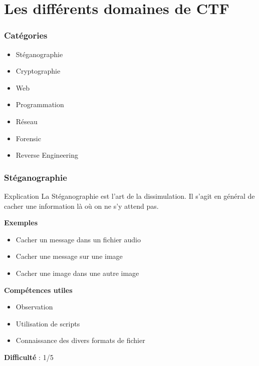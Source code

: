 \documentclass{beamer}
\begin{document}
\section{Les différents domaines de CTF}

\begin{frame}\frametitle{Catégories}

\begin{itemize}
    \item Stéganographie
    \item Cryptographie
    \item Web
    \item Programmation
    \item Réseau
    \item Forensic
    \item Reverse Engineering
\end{itemize}

\end{frame}


\begin{frame}
\frametitle{Stéganographie}

\begin{block}{Explication}
    La Stéganographie est l’art de la dissimulation. Il s’agit en général de cacher une information là où on ne s’y attend pas.
\end{block}

\pause

\textbf{Exemples}
\begin{itemize}
    \item Cacher un message dans un fichier audio
    \item Cacher une message sur une image
    \item Cacher une image dans une autre image
\end{itemize}

\pause

\textbf{Compétences utiles}
\begin{itemize}
    \item Observation \\
    \item Utilisation de scripts \\
    \item Connaissance des divers formats de fichier
\end{itemize}

\pause

\textbf{Difficulté} : 1/5

\end{frame}
\end{document}

